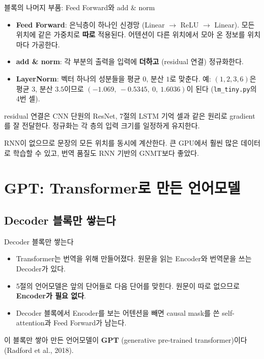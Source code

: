 \documentclass[aspectratio=169,11pt]{beamer}
\begin{document}
\begin{frame}{블록의 나머지 부품: Feed Forward와 add \& norm}
\begin{itemize}
\item \textbf{Feed Forward}: 은닉층이 하나인 신경망 (Linear $\to$ ReLU $\to$ Linear).
  모든 위치에 같은 가중치로 \textbf{따로} 적용된다.
  어텐션이 다른 위치에서 모아 온 정보를 위치마다 가공한다.
\item \textbf{add \& norm}: 각 부분의 출력을 입력에 \textbf{더하고} (residual 연결) 정규화한다.
\item \textbf{LayerNorm}: 벡터 하나의 성분들을 평균 $0$, 분산 $1$로 맞춘다.
  예: $(1,2,3,6)$은 평균 $3$, 분산 $3.5$이므로 $(-1.069,\ -0.5345,\ 0,\ 1.6036)$이 된다
  (\texttt{lm\_tiny.py}의 4번 셀).
\end{itemize}
\vskip1mm
\begin{keybox}
residual 연결은 CNN 단원의 ResNet, 7절의 LSTM 기억 셀과 같은 원리로 gradient를 잘 전달한다.
정규화는 각 층의 입력 크기를 일정하게 유지한다.
\end{keybox}
\vskip1mm
RNN이 없으므로 문장의 모든 위치를 동시에 계산한다.
큰 GPU에서 훨씬 많은 데이터로 학습할 수 있고, 번역 품질도 RNN 기반의 GNMT보다 좋았다.
\end{frame}

\section{GPT: Transformer로 만든 언어모델}

\subsection{Decoder 블록만 쌓는다}

\begin{frame}{Decoder 블록만 쌓는다}
\begin{itemize}
\item Transformer는 번역을 위해 만들어졌다.
  원문을 읽는 Encoder와 번역문을 쓰는 Decoder가 있다.
\item 5절의 언어모델은 앞의 단어들로 다음 단어를 맞힌다.
  원문이 따로 없으므로 \textbf{Encoder가 필요 없다}.
\item Decoder 블록에서 Encoder를 보는 어텐션을 빼면
  causal mask를 쓴 self-attention과 Feed Forward가 남는다.
\end{itemize}
\vskip3mm
\begin{keybox}
이 블록만 쌓아 만든 언어모델이 \textbf{GPT} (generative pre-trained transformer)이다
(Radford et al., 2018).
\end{keybox}
\end{frame}
\end{document}
